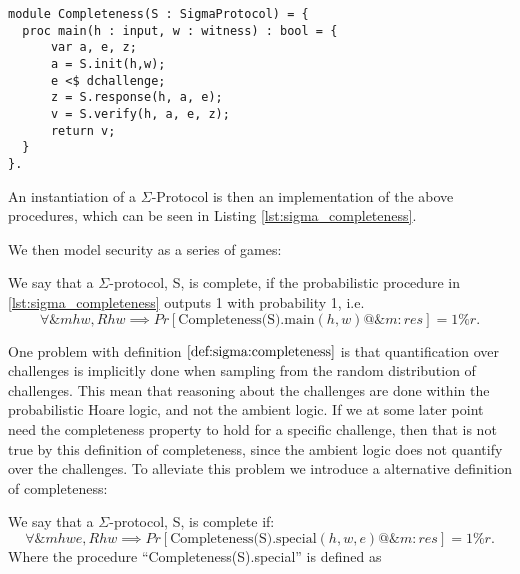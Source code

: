 

\begin{lstlisting}[float, label=lst:sigma_completeness,caption=Completeness game for $\Sigma$-Protocols]
module Completeness(S : SigmaProtocol) = {
  proc main(h : input, w : witness) : bool = {
      var a, e, z;
      a = S.init(h,w);
      e <$ dchallenge;
      z = S.response(h, a, e);
      v = S.verify(h, a, e, z);
      return v;
  }
}.
\end{lstlisting}

An instantiation of a $\Sigma$-Protocol is then an implementation of the above
procedures, which can be seen in Listing \ref{lst:sigma_completeness}.

We then model security as a series of games:

\begin{definition}[Completeness]
\label{def:sigma:completeness}
  We say that a $\Sigma$-protocol, S, is complete, if the probabilistic procedure in
  \ref{lst:sigma_completeness} outputs 1 with probability 1, i.e.
  \begin{equation}
    \label{eq:sigma_completeness}
    \forall \&m h w, R h w \implies Pr[\text{Completeness(S).main}(h,w) @ \&m : res] = 1\%r.
  \end{equation}
\end{definition}

One problem with definition $\ref{def:sigma:completeness}$ is that
quantification over challenges is implicitly done when sampling from the random
distribution of challenges. This mean that reasoning about the challenges are
done within the probabilistic Hoare logic, and not the ambient logic. If we at
some later point need the completeness property to hold for a specific
challenge, then that is not true by this definition of completeness, since
the ambient logic does not quantify over the challenges. To alleviate this
problem we introduce a alternative definition of completeness:

\begin{definition}
\label{def:sigma:alt_completeness}
  We say that a $\Sigma$-protocol, S, is complete if:
  \begin{equation}
    \label{eq:sigma_completeness}
    \forall \&m h w e, R h w \implies Pr[\text{Completeness(S).special}(h,w,e) @ \&m : res] = 1\%r.
  \end{equation}
  Where the procedure ``Completeness(S).special'' is defined as
  
\end{definition}

